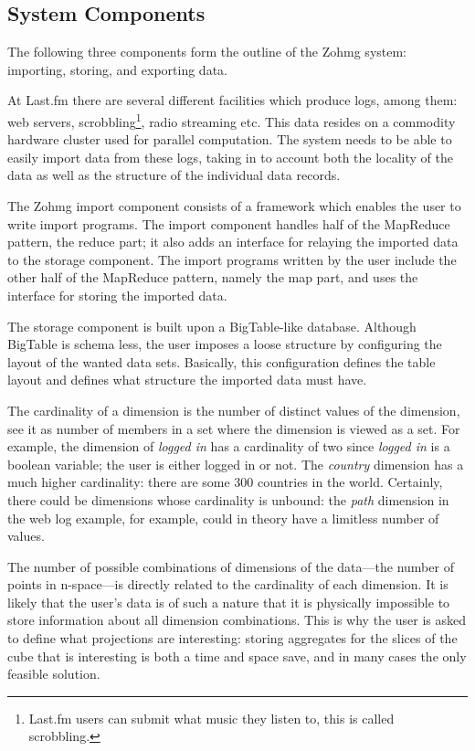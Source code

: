 \subsection*{System Components}

The following three components form the outline of the Zohmg system: importing,
storing, and exporting data.

At Last.fm there are several different facilities which produce logs, among
them: web servers, scrobbling\footnote{Last.fm users can submit what music they
listen to, this is called scrobbling.}, radio streaming etc. This data resides
on a commodity hardware cluster used for parallel computation. The system needs to
be able to easily import data from these logs, taking in to account both the
locality of the data as well as the structure of the individual data records.

The Zohmg import component consists of a framework which enables the user to
write import programs. The import component handles half of the MapReduce
pattern, the reduce part; it also adds an interface for relaying the imported
data to the storage component. The import programs written by the user include
the other half of the MapReduce pattern, namely the map part, and uses the
interface for storing the imported data.

The storage component is built upon a BigTable-like database. Although BigTable
is schema less, the user imposes a loose structure by configuring the layout of
the wanted data sets. Basically, this configuration defines the table layout and
defines what structure the imported data must have.

The cardinality of a dimension is the number of distinct values of the
dimension, see it as number of members in a set where the dimension is
viewed as a set. For example, the dimension of \textit{logged in} has a
cardinality of two since \textit{logged in} is a boolean variable; the user
is either logged in or not. The \textit{country} dimension has a much
higher cardinality: there are some 300 countries in the world. Certainly,
there could be dimensions whose cardinality is unbound: the \textit{path}
dimension in the web log example, for example, could in theory have a
limitless number of values.

The number of possible combinations of dimensions of the data---the number
of points in n-space---is directly related to the cardinality of each
dimension. It is likely that the user's data is of such a nature that it is
physically impossible to store information about all dimension
combinations.  This is why the user is asked to define what projections are
interesting: storing aggregates for the slices of the cube that is
interesting is both a time and space save, and in many cases the only
feasible solution.

